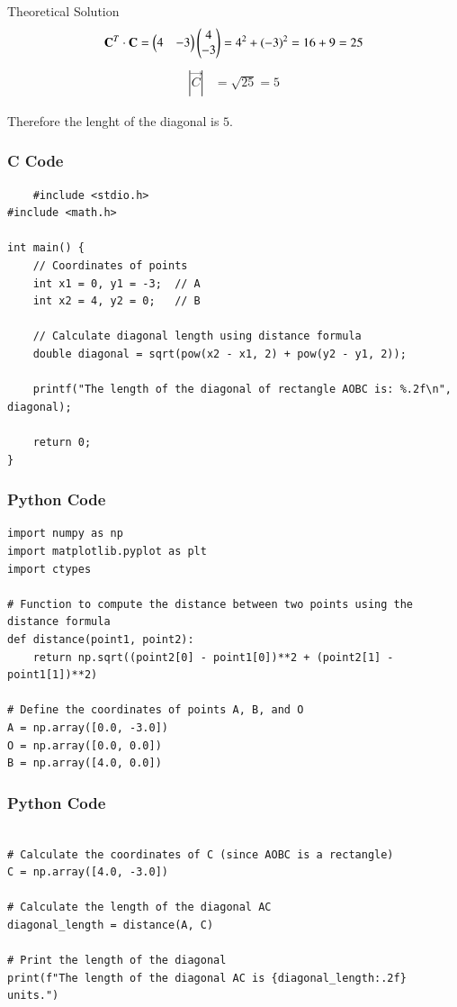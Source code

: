 \documentclass{beamer}
\begin{document}
\begin{frame}{Theoretical Solution}
\begin{align}
      \mathbf{C}^T \cdot \mathbf{C}=\begin{pmatrix}4 & -3\end{pmatrix}\begin{pmatrix}4 \\ -3\end{pmatrix} = 4^2 + (-3)^2 = 16 + 9 = 25
\end{align}
\begin{align}  
      \left|\vec{C}\right| &= \sqrt{25} = 5 
 \end{align}
 \begin{center}
Therefore the lenght of the diagonal is $5$.
 \end{center}
\end{frame}

\begin{frame}[fragile]
    \frametitle{C Code }

\begin{lstlisting}
    #include <stdio.h>
#include <math.h>

int main() {
    // Coordinates of points
    int x1 = 0, y1 = -3;  // A
    int x2 = 4, y2 = 0;   // B

    // Calculate diagonal length using distance formula
    double diagonal = sqrt(pow(x2 - x1, 2) + pow(y2 - y1, 2));

    printf("The length of the diagonal of rectangle AOBC is: %.2f\n", diagonal);

    return 0;
}
\end{lstlisting}
\end{frame}

\begin{frame}[fragile]
    \frametitle{Python Code}
    \begin{lstlisting}
import numpy as np
import matplotlib.pyplot as plt
import ctypes

# Function to compute the distance between two points using the distance formula
def distance(point1, point2):
    return np.sqrt((point2[0] - point1[0])**2 + (point2[1] - point1[1])**2)

# Define the coordinates of points A, B, and O
A = np.array([0.0, -3.0])
O = np.array([0.0, 0.0])
B = np.array([4.0, 0.0])
\end{lstlisting}
\end{frame}

\begin{frame}[fragile]
    \frametitle{Python Code}
    \begin{lstlisting}

# Calculate the coordinates of C (since AOBC is a rectangle)
C = np.array([4.0, -3.0])

# Calculate the length of the diagonal AC
diagonal_length = distance(A, C)

# Print the length of the diagonal
print(f"The length of the diagonal AC is {diagonal_length:.2f} units.")
\end{lstlisting}
\end{frame}
\end{document}
